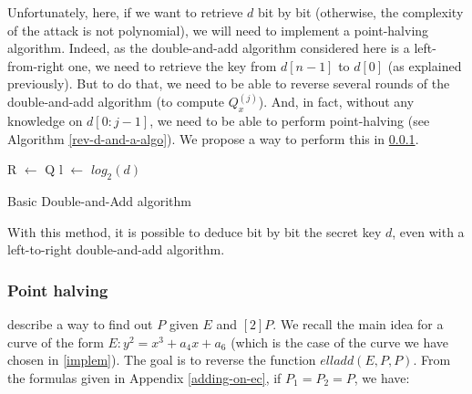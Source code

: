 \documentclass[journal]{IEEEtran}
\begin{document}
Unfortunately, here, if we want to retrieve $d$ bit by bit (otherwise, the complexity of the attack is not polynomial), we will need to implement a point-halving algorithm. 
Indeed, as the double-and-add algorithm considered here is a left-from-right one, we need to retrieve the key from $d[n-1]$ to $d[0]$ (as explained previously). But to do that, we need
to be able to reverse several rounds of the double-and-add algorithm (to compute $Q_x^{(j)}$). And, in fact, without any knowledge on $d[0:j-1]$, we need to be able to perform point-halving
(see Algorithm \ref{rev-d-and-a-algo}). We propose a way to perform this in \ref{point-halving-sec}.

\begin{algorithm}
    \SetAlgoLined %
   
    \SetSideCommentLeft 
    \SetNoFillComment

    
    
    R $\leftarrow$ Q\;
    l $\leftarrow$ $log_2(d)$\;

    \bigskip

    \caption{Basic Double-and-Add algorithm}
    \label{rev-d-and-a-algo}

\end{algorithm}

With this method, it is possible to deduce bit by bit the secret key $d$, even with a left-to-right double-and-add algorithm.\\

\subsubsection{Point halving}
\label{point-halving-sec}
\cite{rodriguezelliptic} describe a way to find out $P$ given $E$ and $[2]P$. We recall the main idea for a curve of the form $E: y^2 = x^3 + a_4x + a_6$ (which is the case of the curve we have chosen in \ref{implem}).
The goal is to reverse the function $elladd(E, P, P)$. From the formulas given in Appendix \ref{adding-on-ec}, if $P_1 = P_2 = P$, we have:
\end{document}
